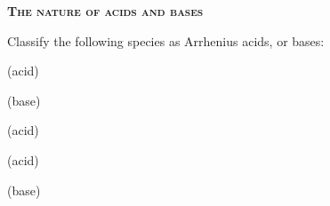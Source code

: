 \documentclass[main.tex]{subfiles}
\begin{document}
\newpage
\setdoublesep{0.35700 em}  %
\setatomsep{1.78500 em}    %
\setbondoffset{0.18265 em} %
\newcommand{\bondwidth}{0.06642 em} %
\setbondstyle{line width = \bondwidth}
\fancyhfoffset[E,O]{0pt}
\setlength{\columnsep}{30pt}
\begin{conclusion}
\end{conclusion}
\begin{multicols*}{2}\setcounter{numA}{1}

{\raggedright\textsc{\textbf{The nature of acids and bases}}\par}


\begin{question}[ID=\the\value{numA}]
Classify the following species as Arrhenius acids, or bases:
\begin{inparaenum}[(a)]
\item {} %
\item {} %
\item {} %
\item {} %
\item {} %
 \end{inparaenum}
\end{question}
\begin{solution}
\begin{inparaenum}[(a)]
\item {}   (acid)
\item {}   (base)
\item {}   (acid)
\item {}   (acid)
\item {}   (base)
\end{inparaenum}
\hspace{0.1cm}\end{solution}%



\end{multicols*}
\end{document}
